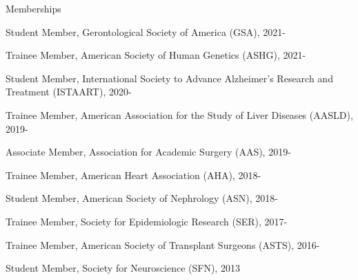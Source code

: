 \documentclass[10pt]{article}
\renewcommand{\section}[1]{\pagebreak[3]%
    \vspace{1.3\baselineskip}%
    \phantomsection\addcontentsline{toc}{section}{#1}%
    \noindent\llap{\scshape\smash{\parbox[t]{\marginparwidth}{\hyphenpenalty=10000\raggedright #1}}}%
    \vspace{-\baselineskip}\par}
\begin{document}
\vspace{2mm}

Memberships

\begin{innerlist}

\item Student Member, Gerontological Society of America (GSA), 2021-
\item Trainee Member, American Society of Human Genetics (ASHG), 2021-
\item Student Member, International Society to Advance Alzheimer's Research and Treatment (ISTAART), 2020-
\item Trainee Member, American Association for the Study of
  Liver Diseases (AASLD), 2019-
\item Associate Member, Association for Academic Surgery (AAS), 2019-
\item Trainee Member, American Heart Association (AHA), 2018-
\item Student Member, American Society of Nephrology (ASN), 2018-
\item Trainee Member, Society for Epidemiologic Research (SER), 2017-
\item Trainee Member, American Society of Transplant Surgeons (ASTS), 2016-
\item Student Member, Society for Neuroscience (SFN), 2013

\end{innerlist}

\end{document}
